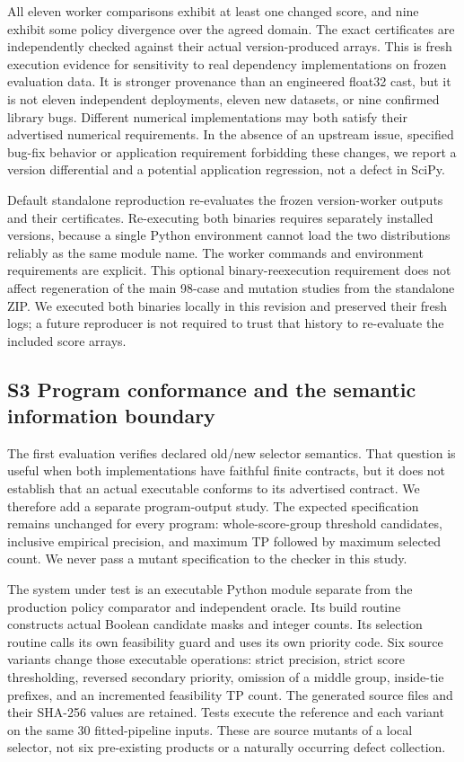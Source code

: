 \documentclass[11pt,a4paper]{article}
\theoremstyle{plain}
\theoremstyle{definition}
\theoremstyle{remark}
\begin{document}
All eleven worker comparisons exhibit at least one changed score, and nine exhibit some policy divergence over the agreed domain. The exact certificates are independently checked against their actual version-produced arrays. This is fresh execution evidence for sensitivity to real dependency implementations on frozen evaluation data. It is stronger provenance than an engineered float32 cast, but it is not eleven independent deployments, eleven new datasets, or nine confirmed library bugs. Different numerical implementations may both satisfy their advertised numerical requirements. In the absence of an upstream issue, specified bug-fix behavior or application requirement forbidding these changes, we report a version differential and a potential application regression, not a defect in SciPy.

Default standalone reproduction re-evaluates the frozen version-worker outputs and their certificates. Re-executing both binaries requires separately installed versions, because a single Python environment cannot load the two distributions reliably as the same module name. The worker commands and environment requirements are explicit. This optional binary-reexecution requirement does not affect regeneration of the main 98-case and mutation studies from the standalone ZIP. We executed both binaries locally in this revision and preserved their fresh logs; a future reproducer is not required to trust that history to re-evaluate the included score arrays.


\subsection*{S3 Program conformance and the semantic information boundary}\label{sec:s3}

The first evaluation verifies declared old/new selector semantics. That question is useful when both implementations have faithful finite contracts, but it does not establish that an actual executable conforms to its advertised contract. We therefore add a separate program-output study. The expected specification remains unchanged for every program: whole-score-group threshold candidates, inclusive empirical precision, and maximum TP followed by maximum selected count. We never pass a mutant specification to the checker in this study.

The system under test is an executable Python module separate from the production policy comparator and independent oracle. Its build routine constructs actual Boolean candidate masks and integer counts. Its selection routine calls its own feasibility guard and uses its own priority code. Six source variants change those executable operations: strict precision, strict score thresholding, reversed secondary priority, omission of a middle group, inside-tie prefixes, and an incremented feasibility TP count. The generated source files and their SHA-256 values are retained. Tests execute the reference and each variant on the same 30 fitted-pipeline inputs. These are source mutants of a local selector, not six pre-existing products or a naturally occurring defect collection.
\end{document}
